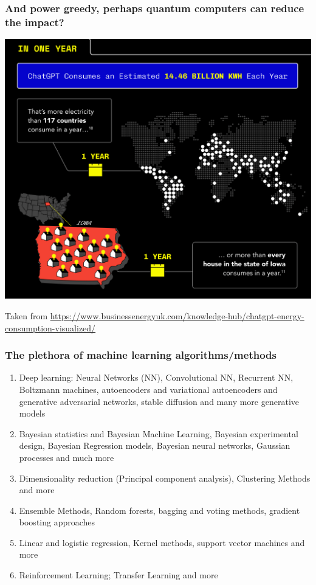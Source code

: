 \documentclass{beamer}
\begin{document}
\begin{frame}
\frametitle{And power greedy, perhaps quantum computers can reduce the impact?}

\centerline{\includegraphics[width=0.7\linewidth]{figures/aitalk1.png}}
Taken from \url{https://www.businessenergyuk.com/knowledge-hub/chatgpt-energy-consumption-visualized/}
\end{frame}





\begin{frame}
\frametitle{The plethora  of machine learning algorithms/methods}

\begin{enumerate}
\item Deep learning: Neural Networks (NN), Convolutional NN, Recurrent NN, Boltzmann machines, autoencoders and variational autoencoders  and generative adversarial networks, stable diffusion and many more generative models

\item Bayesian statistics and Bayesian Machine Learning, Bayesian experimental design, Bayesian Regression models, Bayesian neural networks, Gaussian processes and much more

\item Dimensionality reduction (Principal component analysis), Clustering Methods and more

\item Ensemble Methods, Random forests, bagging and voting methods, gradient boosting approaches 

\item Linear and logistic regression, Kernel methods, support vector machines and more

\item Reinforcement Learning; Transfer Learning and more 
\end{enumerate}

\noindent
\end{frame}
\end{document}
